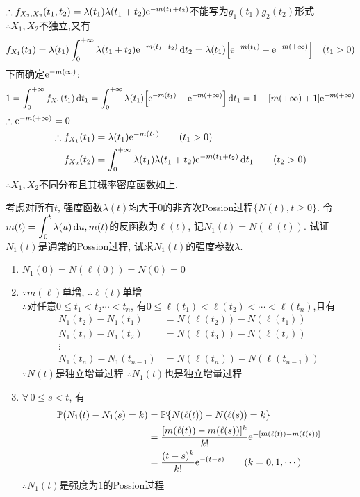 \begin{solution}[1]
	$\therefore f_{X_2,X_2}(t_1,t_2) = \lambda(t_1)\lambda(t_1+t_2)\mathrm{e}^{-m(t_1+t_2)}$不能写为$g_1(t_1)g_2(t_2)$形式\\
	$\therefore X_1, X_2$不独立,又有
	\[f_{X_1}(t_1) = \lambda(t_1)\int^{+\infty}_0\lambda(t_1+t_2)\mathrm{e}^{-m(t_1+t_2)}\mathop{}\!\mathrm{d} t_2 = \lambda(t_1)\Big[\mathrm{e}^{-m(t_1)}-\mathrm{e}^{-m(+\infty)}\Big]\quad (t_1 > 0)\]
	下面确定$\mathrm{e}^{-m(\infty)}$:
	\[1 = \int^{+\infty}_0f_{X_1}(t_1)\mathop{}\!\mathrm{d} t_1 = \int^{+\infty}_0\lambda(t_1)\Big[\mathrm{e}^{-m(t_1)}-\mathrm{e}^{-m(+\infty)}\Big]\mathop{}\!\mathrm{d} t_1 = 1 - [m(+\infty)+1]\mathrm{e}^{-m(+\infty)}\]
	$\therefore \mathrm{e}^{-m(+\infty)} = 0$
	\[\begin{split}
			\therefore f_{X_1}(t_1) & = \lambda(t_1)\mathrm{e}^{-m(t_1)}\qquad (t_1>0)\\
			f_{X_2}(t_2) & = \int^{+\infty}_0\lambda(t_1)\lambda(t_1+t_2)\mathrm{e}^{-m(t_1+t_2)}\mathop{}\!\mathrm{d} t_1 \qquad (t_2>0)\\
		\end{split}\]
	$\therefore X_1,X_2$不同分布且其概率密度函数如上.
\end{solution}

\begin{problem}{2.13}
考虑对所有$t$, 强度函数$\lambda (t)$均大于$0$的非齐次Possion过程$\{N(t), t \geqslant 0\}$. 令$\displaystyle m(t) = \int^t_0 \lambda(u)\mathop{}\!\mathrm{d} u, m(t)$的反函数为$\ell(t)$, 记$N_1(t)= N(\ell(t))$. 试证$N_1(t)$是通常的Possion过程, 试求$N_1(t)$的强度参数$\lambda$.
\end{problem}
\begin{solution}
	\begin{enumerate}[label=(\roman*)]
		\item $N_1(0)=N(\ell(0))=N(0)=0$
		\item $\because m(\ell)$单增, $\therefore \ell(t)$单增\\
		      $\therefore $对任意$0 \leqslant t_1 < t_2 \cdots < t_n$, 有$0 \leqslant \ell(t_1) < \ell(t_2) < \cdots < \ell(t_n)$,且有
		      \begin{align*}
			      N_1(t_2) - N_1(t_1)     & = N(\ell(t_2)) - N(\ell(t_1))     \\
			      N_1(t_3) - N_1(t_2)     & = N(\ell(t_3)) - N(\ell(t_2))     \\
			      \vdots                                                      \\
			      N_1(t_n) - N_1(t_{n-1}) & = N(\ell(t_n)) - N(\ell(t_{n-1}))
		      \end{align*}
		      $\because N(t)$是独立增量过程 \quad $\therefore N_1(t)$也是独立增量过程
		\item $\forall \,0 \leqslant s < t$, 有
		      \[\begin{split}
				      \mathbb{P}(N_1(t) - N_1(s) = k) & = \mathbb{P}\{N(\ell(t)) - N(\ell(s)) = k\}\\
				      & = \frac{[m(\ell(t)) - m(\ell(s))]^k}{k!} \mathrm{e}^{-[m(\ell(t)) - m(\ell(s))]}\\
				      & = \frac{(t-s)^k}{k!}\mathrm{e}^{-(t-s)} \qquad (k=0,1,\cdots)
			      \end{split}\]
		      $\therefore N_1(t)$是强度为$1$的Possion过程
	\end{enumerate}
\end{solution}

